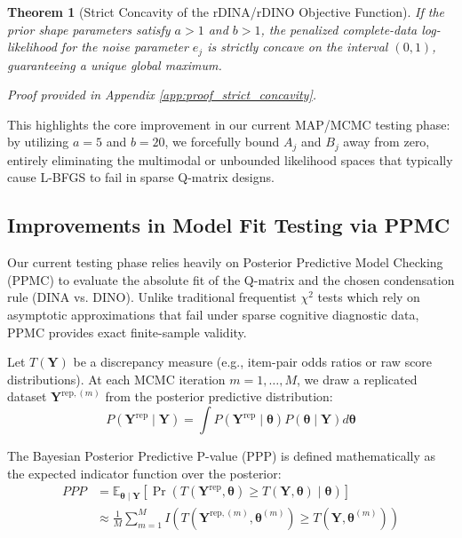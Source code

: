 \documentclass[11pt,a4paper]{article}
\newtheorem{theorem}{Theorem}
\begin{document}
\begin{theorem}[Strict Concavity of the rDINA/rDINO Objective Function]\label{thm:strict_concavity}
If the prior shape parameters satisfy $a > 1$ and $b > 1$, 
the penalized complete-data log-likelihood for the noise parameter $e_j$ 
is strictly concave on the interval $(0, 1)$, 
guaranteeing a unique global maximum.
\end{theorem}
\textit{Proof provided in Appendix \ref{app:proof_strict_concavity}.}

This highlights the core improvement in our current MAP/MCMC testing phase: 
by utilizing $a=5$ and $b=20$, we forcefully bound $A_j$ and $B_j$ away from zero, 
entirely eliminating the multimodal or unbounded likelihood spaces 
that typically cause L-BFGS to fail in sparse Q-matrix designs.

\subsection{Improvements in Model Fit Testing via PPMC}

Our current testing phase relies heavily on Posterior Predictive Model 
Checking (PPMC) to evaluate the absolute fit of the Q-matrix and 
the chosen condensation rule (DINA vs. DINO). 
Unlike traditional frequentist $\chi^2$ tests which rely on asymptotic 
approximations that fail under sparse cognitive diagnostic data, 
PPMC provides exact finite-sample validity.

Let $T(\mathbf{Y})$ be a discrepancy measure 
(e.g., item-pair odds ratios or raw score distributions). 
At each MCMC iteration $m = 1, \dots, M$, we draw a replicated dataset 
$\mathbf{Y}^{\text{rep},(m)}$ from the posterior predictive distribution:
\begin{equation}
    P(\mathbf{Y}^{\text{rep}} \mid \mathbf{Y}) 
    = \int P(\mathbf{Y}^{\text{rep}} \mid \boldsymbol{\theta}) 
    P(\boldsymbol{\theta} \mid \mathbf{Y}) d\boldsymbol{\theta}
\end{equation}

The Bayesian Posterior Predictive P-value (PPP) is defined mathematically 
as the expected indicator function over the posterior:
\begin{equation}
\begin{split}
    PPP &= \mathbb{E}_{\boldsymbol{\theta} \mid \mathbf{Y}} 
    \left[ \Pr(T(\mathbf{Y}^{\text{rep}}, \boldsymbol{\theta}) 
    \ge T(\mathbf{Y}, \boldsymbol{\theta}) \mid \boldsymbol{\theta}) \right] \\
    &\approx \frac{1}{M} \sum_{m=1}^M 
    I\left(T(\mathbf{Y}^{\text{rep},(m)}, \boldsymbol{\theta}^{(m)}) 
    \ge T(\mathbf{Y}, \boldsymbol{\theta}^{(m)})\right)
\end{split}
\end{equation}
\end{document}
